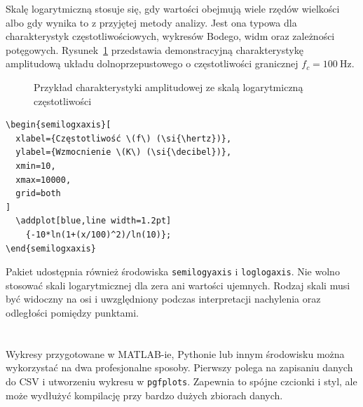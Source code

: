 Skalę logarytmiczną stosuje się, gdy wartości obejmują wiele rzędów wielkości albo gdy wynika to z przyjętej metody analizy. Jest ona typowa dla charakterystyk częstotliwościowych, wykresów Bodego, widm oraz zależności potęgowych. Rysunek~\ref{fig:skala-logarytmiczna} przedstawia demonstracyjną charakterystykę amplitudową układu dolnoprzepustowego o częstotliwości granicznej \(f_c=\SI{100}{\hertz}\).

\begin{figure}[htbp]
  \centering
  \caption{Przykład charakterystyki amplitudowej ze skalą logarytmiczną częstotliwości}
  \label{fig:skala-logarytmiczna}
\end{figure}

\begin{lstlisting}[caption={\ploren{Wykres z logarytmiczną osią częstotliwości}{Plot with a logarithmic frequency axis}}]
\begin{semilogxaxis}[
  xlabel={Częstotliwość \(f\) (\si{\hertz})},
  ylabel={Wzmocnienie \(K\) (\si{\decibel})},
  xmin=10,
  xmax=10000,
  grid=both
]
  \addplot[blue,line width=1.2pt]
    {-10*ln(1+(x/100)^2)/ln(10)};
\end{semilogxaxis}
\end{lstlisting}

Pakiet udostępnia również środowiska \texttt{semilogyaxis} i \texttt{loglogaxis}. Nie wolno stosować skali logarytmicznej dla zera ani wartości ujemnych. Rodzaj skali musi być widoczny na osi i uwzględniony podczas interpretacji nachylenia oraz odległości pomiędzy punktami.

\section{}

Wykresy przygotowane w MATLAB-ie, Pythonie lub innym środowisku można wykorzystać na dwa profesjonalne sposoby. Pierwszy polega na zapisaniu danych do CSV i utworzeniu wykresu w \texttt{pgfplots}. Zapewnia to spójne czcionki i styl, ale może wydłużyć kompilację przy bardzo dużych zbiorach danych.

